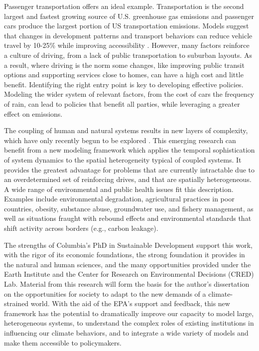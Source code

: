 \documentclass[12pt, oneside]{amsart}
\begin{document}
Passenger transportation offers an ideal example.  Transportation is the second largest and fastest growing source of U.S. greenhouse gas emissions and passenger cars produce the largest portion of US transportation emissions.  Models suggest that changes in development patterns and transport behaviors can reduce vehicle travel by 10-25\% while improving accessibility \citep{greene2011reducing}.  However, many factors reinforce a culture of driving, from a lack of public transportation to suburban layouts.  As a result, where driving is the norm some changes, like improving public transit options and supporting services close to homes, can have a high cost and little benefit.  Identifying the right entry point is key to developing effective policies.  Modeling the wider system of relevant factors, from the cost of cars the frequency of rain, can lead to policies that benefit all parties, while leveraging a greater effect on emissions.  

The coupling of human and natural systems results in new layers of complexity, which have only recently begun to be explored \citep{liu2007complexity}.  This emerging research can benefit from a new modeling framework which applies the temporal sophistication of system dynamics to the spatial heterogeneity typical of coupled systems.  It provides the greatest advantage for problems that are currently intractable due to an overdetermined set of reinforcing drives, and that are spatially heterogeneous.  A wide range of environmental and public health issues fit this description.  Examples include environmental degradation, agricultural practices in poor countries, obesity, substance abuse, groundwater use, and fishery management, as well as situations fraught with rebound effects \cite[as in][]{greening2000energy} and environmental standards that shift activity across borders (e.g., carbon leakage).


The strengths of Columbia's PhD in Sustainable Development support this work, with the rigor of its economic foundations, the strong foundation it provides in the natural and human sciences, and the many opportunities provided under the Earth Institute and the Center for Research on Environmental Decisions (CRED) Lab.  Material from this research will form the basis for the author's dissertation on the opportunities for society to adapt to the new demands of a climate-strained world.  With the aid of the EPA's support and feedback, this new framework has the potential to dramatically improve our capacity to model large, heterogeneous systems, to understand the complex roles of existing institutions in influencing our climate behaviors, and to integrate a wide variety of models and make them accessible to policymakers.
\end{document}
